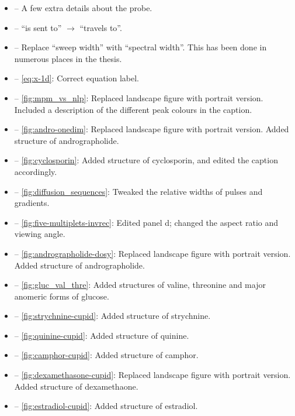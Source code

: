 \documentclass[12pt]{article}
\begin{document}
\begin{itemize}
        \item {} -- A few extra details about the probe.
        \item {} -- ``is sent to'' $\rightarrow$ ``travels to''.
        \item {} -- Replace ``sweep width'' with ``spectral
            width''. This has been done in numerous places in the thesis.
        \item {} -- \cref{eq:x-1d}: Correct equation label.
        \item {} -- \cref{fig:mpm_vs_nlp}: Replaced
            landscape figure with portrait version. Included a description of the
            different peak colours in the caption.
        \item {} -- \cref{fig:andro-onedim}: Replaced
            landscape figure with portrait version. Added structure of andrographolide.
        \item {} -- \cref{fig:cyclosporin}: Added structure of
            cyclosporin, and edited the caption accordingly.
        \item {} -- \cref{fig:diffusion_sequences}:
            Tweaked the relative widths of pulses and gradients.
        \item {} -- \cref{fig:five-multiplets-invrec}:
            Edited panel d; changed the aspect ratio and viewing angle.
        \item {} -- \cref{fig:andrographolide-dosy}:
            Replaced landscape figure with portrait version. Added structure of
            andrographolide.
        \item {} -- \cref{fig:gluc_val_thre}: Added
            structures of valine, threonine and major anomeric forms of glucose.
        \item {} -- \cref{fig:strychnine-cupid}: Added
            structure of strychnine.
        \item {} -- \cref{fig:quinine-cupid}: Added structure
            of quinine.
        \item {} -- \cref{fig:camphor-cupid}: Added structure
            of camphor.
        \item {} -- \cref{fig:dexamethasone-cupid}:
            Replaced landscape figure with portrait version. Added structure of
            dexamethaone.
        \item {} -- \cref{fig:estradiol-cupid}: Added
            structure of estradiol.
    \end{itemize}
\end{document}
